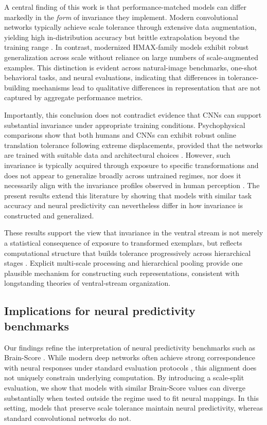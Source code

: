 \documentclass[pdflatex,sn-nature]{sn-jnl}
\begin{document}
A central finding of this work is that performance-matched models can differ markedly in the \emph{form} of invariance they implement. Modern convolutional networks typically achieve scale tolerance through extensive data augmentation, yielding high in-distribution accuracy but brittle extrapolation beyond the training range \citep{Azulay2019why,Han2020}. In contrast, modernized HMAX-family models exhibit robust generalization across scale without reliance on large numbers of scale-augmented examples. This distinction is evident across natural-image benchmarks, one-shot behavioral tasks, and neural evaluations, indicating that differences in tolerance-building mechanisms lead to qualitative differences in representation that are not captured by aggregate performance metrics.

Importantly, this conclusion does not contradict evidence that CNNs can support substantial invariance under appropriate training conditions. Psychophysical comparisons show that both humans and CNNs can exhibit robust online translation tolerance following extreme displacements, provided that the networks are trained with suitable data and architectural choices \citep{Blything2021}. However, such invariance is typically acquired through exposure to specific transformations and does not appear to generalize broadly across untrained regimes, nor does it necessarily align with the invariance profiles observed in human perception \citep{Cui2020}. The present results extend this literature by showing that models with similar task accuracy and neural predictivity can nevertheless differ in how invariance is constructed and generalized.

These results support the view that invariance in the ventral stream is not merely a statistical consequence of exposure to transformed exemplars, but reflects computational structure that builds tolerance progressively across hierarchical stages \citep{Logothetis1995,DiCarlo2012}. Explicit multi-scale processing and hierarchical pooling provide one plausible mechanism for constructing such representations, consistent with longstanding theories of ventral-stream organization.

\subsection{Implications for neural predictivity benchmarks}

Our findings refine the interpretation of neural predictivity benchmarks such as Brain-Score \citep{Schrimpf2020-az}. While modern deep networks often achieve strong correspondence with neural responses under standard evaluation protocols \citep{Yamins2014,Cadieu2014}, this alignment does not uniquely constrain underlying computation. By introducing a scale-split evaluation, we show that models with similar Brain-Score values can diverge substantially when tested outside the regime used to fit neural mappings. In this setting, models that preserve scale tolerance maintain neural predictivity, whereas standard convolutional networks do not.
\end{document}
